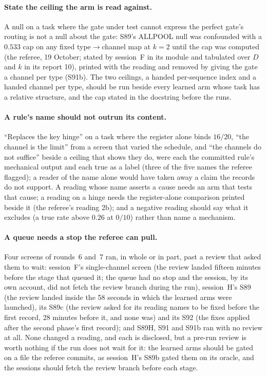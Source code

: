 \documentclass[11pt]{article}
\begin{document}
\paragraph{State the ceiling the arm is read against.} A null on a task where the gate under test cannot express the perfect gate's routing is not a null about the gate: S89's ALLPOOL null was confounded with a $0.533$ cap on any fixed type$\to$channel map at $k = 2$ until the cap was computed (the referee, 19 October; stated by session~F in its module and tabulated over $D$ and $k$ in its report 10), printed with the reading and removed by giving the gate a channel per type (S91b). The two ceilings, a handed per-sequence index and a handed channel per type, should be run beside every learned arm whose task has a relative structure, and the cap stated in the docstring before the runs.

\paragraph{A rule's name should not outrun its content.} ``Replaces the key hinge'' on a task where the register alone binds $16/20$, ``the channel is the limit'' from a screen that varied the schedule, and ``the channels do not suffice'' beside a ceiling that shows they do, were each the committed rule's mechanical output and each true as a label (three of the five names the referee flagged); a reader of the name alone would have taken away a claim the records do not support. A reading whose name asserts a cause needs an arm that tests that cause; a reading on a hinge needs the register-alone comparison printed beside it (the referee's reading 2b); and a negative reading should say what it excludes (a true rate above $0.26$ at $0/10$) rather than name a mechanism.

\paragraph{A queue needs a stop the referee can pull.} Four screens of rounds~6 and~7 ran, in whole or in part, past a review that asked them to wait: session~F's single-channel screen (the review landed fifteen minutes before the stage that queued it; the queue had no stop and the session, by its own account, did not fetch the review branch during the run), session~H's S89 (the review landed inside the 58 seconds in which the learned arms were launched), its S89c (the review asked for its reading names to be fixed before the first record, 28 minutes before it, and none was) and its S92 (the fixes applied after the second phase's first record); and S89H, S91 and S91b ran with no review at all. None changed a reading, and each is disclosed, but a pre-run review is worth nothing if the run does not wait for it: the learned arms should be gated on a file the referee commits, as session~H's S89b gated them on its oracle, and the sessions should fetch the review branch before each stage.
\end{document}
